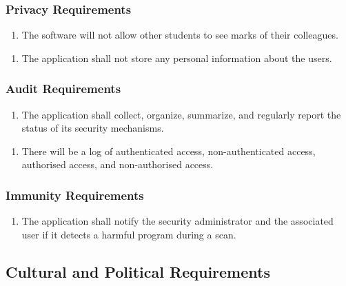 \documentclass[]{article}
\begin{document}
\subsubsection{Privacy Requirements}
\label{ssub:privacy_requirements}
\begin{enumerate}[{SR}1. ]
	\item The software will not allow other students to see marks of their colleagues. 
\end{enumerate}
\begin{enumerate}[{SR}2. ]
	\item The application shall not store any personal information about the users.
\end{enumerate}

\subsubsection{Audit Requirements}
\label{ssub:audit_requirements}
\begin{enumerate}[{SR}1. ]
	\item The application shall collect, organize, summarize, and regularly report the status of its security mechanisms.
\end{enumerate}
\begin{enumerate}[{SR}2. ]
	\item There will be a log of authenticated access, non-authenticated access, authorised access, and non-authorised access.
\end{enumerate}

\subsubsection{Immunity Requirements}
\label{ssub:immunity_requirements}
\begin{enumerate}[{SR}1. ]
	\item The application shall notify the security administrator and the associated user if it detects a harmful program during a scan.
\end{enumerate}


\subsection{Cultural and Political Requirements}
\label{sub:cultural_and_political_requirements}
\end{document}
